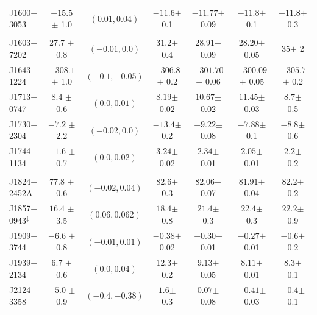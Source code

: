 \documentclass[useAMS,usenatbib]{mn2e}
\begin{document}
\begin{table}
\begin{tabular}{lcccccc}
J1600$-$3053            & $-15.5 $ $\pm$ 1.0      &  $(0.01, 0.04)   $ & $-11.6  $$\pm$ 0.1   & $-11.77  $$\pm$ 0.09  &  $-11.8   $$\pm$ 0.1   &  $-11.8  $$\pm$ 0.3    \\  
                        &                         &                    &                      &                       &                        &                        \\
J1603$-$7202            & $27.7  $ $\pm$ 0.8      &  $(-0.01, 0.0)   $ & $31.2   $$\pm$ 0.4   & $28.91   $$\pm$ 0.09  &  $28.20   $$\pm$ 0.05  &  $35     $$\pm$ 2    \\  
J1643$-$1224            & $-308.1$ $\pm$ 1.0      &  $(-0.1, -0.05)  $ & $-306.8 $$\pm$ 0.2   & $-301.70 $$\pm$ 0.06  &  $-300.09 $$\pm$ 0.05  &  $-305.7 $$\pm$ 0.2    \\   
J1713$+$0747            & $8.4   $ $\pm$ 0.6      &  $(0.0, 0.01)    $ & $8.19   $$\pm$ 0.02  & $10.67   $$\pm$ 0.02  &  $11.45   $$\pm$ 0.03  &  $8.7    $$\pm$ 0.5    \\  
J1730$-$2304            & $-7.2  $ $\pm$ 2.2      &  $(-0.02, 0.0)   $ & $-13.4  $$\pm$ 0.2   & $-9.22   $$\pm$ 0.08  &  $-7.88   $$\pm$ 0.1   &  $-8.8   $$\pm$ 0.6    \\  
J1744$-$1134            & $-1.6  $ $\pm$ 0.7      &  $(0.0, 0.02)    $ & $3.24   $$\pm$ 0.02  & $2.34    $$\pm$ 0.01  &  $2.05    $$\pm$ 0.01  &  $2.2    $$\pm$ 0.2    \\  
                        &                         &                    &                      &                       &                        &                        \\
J1824$-$2452A           & $77.8  $ $\pm$ 0.6      &  $(-0.02, 0.04)  $ & $82.6   $$\pm$ 0.3   & $82.06   $$\pm$ 0.07  &  $81.91   $$\pm$ 0.04  &  $82.2   $$\pm$ 0.2    \\  
J1857$+$0943$^\ddagger$ & $16.4  $ $\pm$ 3.5      &  $(0.06, 0.062)  $ & $18.4   $$\pm$ 0.8   & $21.4    $$\pm$ 0.3   &  $22.4    $$\pm$ 0.3   &  $22.2   $$\pm$ 0.9    \\  
J1909$-$3744            & $-6.6  $ $\pm$ 0.8      &  $(-0.01, 0.01)  $ & $-0.38  $$\pm$ 0.02  & $-0.30   $$\pm$ 0.01  &  $-0.27   $$\pm$ 0.01  &  $-0.6   $$\pm$ 0.2    \\  
J1939$+$2134            & $6.7   $ $\pm$ 0.6      &  $(0.0, 0.04)    $ & $12.3   $$\pm$ 0.2   & $9.13    $$\pm$ 0.05  &  $8.11    $$\pm$ 0.01  &  $8.3    $$\pm$ 0.1    \\  
J2124$-$3358            & $-5.0  $ $\pm$ 0.9      &  $(-0.4, -0.38)  $ & $1.6    $$\pm$ 0.3   & $0.07    $$\pm$ 0.08  &  $-0.41   $$\pm$ 0.03  &  $-0.4   $$\pm$ 0.1    \\  

\end{tabular}
\end{table}
\end{document}
